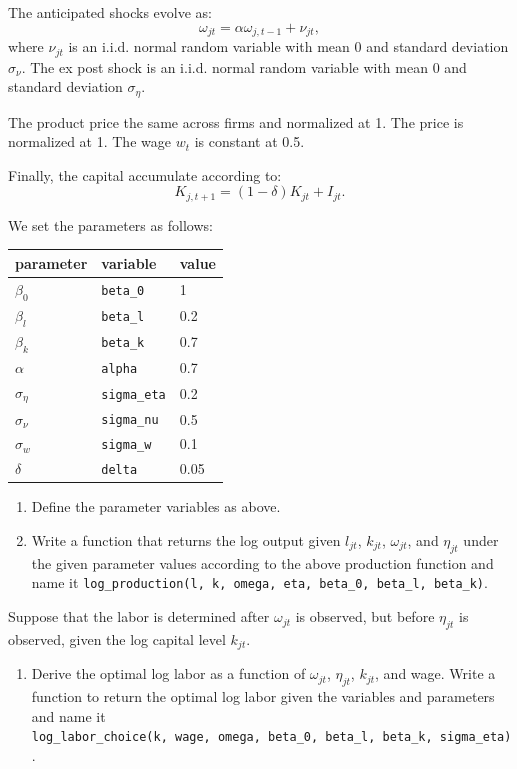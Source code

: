 \documentclass[
]{book}
\providecommand{\tightlist}{%
  \setlength{\itemsep}{0pt}\setlength{\parskip}{0pt}}
\begin{document}
The anticipated shocks evolve as:
\[
\omega_{jt} = \alpha \omega_{j, t - 1} + \nu_{jt},
\]
where \(\nu_{jt}\) is an i.i.d. normal random variable with mean 0 and standard deviation \(\sigma_\nu\). The ex post shock is an i.i.d. normal random variable with mean 0 and standard deviation \(\sigma_{\eta}\).

The product price the same across firms and normalized at 1. The price is normalized at 1. The wage \(w_t\) is constant at 0.5.

Finally, the capital accumulate according to:
\[
K_{j, t + 1} = (1 - \delta) K_{jt} + I_{jt}.
\]

We set the parameters as follows:

\begin{longtable}[]{@{}lll@{}}
\toprule()
parameter & variable & value \\
\midrule()
\endhead
\(\beta_0\) & \texttt{beta\_0} & 1 \\
\(\beta_l\) & \texttt{beta\_l} & 0.2 \\
\(\beta_k\) & \texttt{beta\_k} & 0.7 \\
\(\alpha\) & \texttt{alpha} & 0.7 \\
\(\sigma_{\eta}\) & \texttt{sigma\_eta} & 0.2 \\
\(\sigma_{\nu}\) & \texttt{sigma\_nu} & 0.5 \\
\(\sigma_{w}\) & \texttt{sigma\_w} & 0.1 \\
\(\delta\) & \texttt{delta} & 0.05 \\
\bottomrule()
\end{longtable}

\begin{enumerate}
\def\labelenumi{\arabic{enumi}.}
\item
  Define the parameter variables as above.
\item
  Write a function that returns the log output given \(l_{jt}\), \(k_{jt}\), \(\omega_{jt}\), and \(\eta_{jt}\) under the given parameter values according to the above production function and name it \texttt{log\_production(l,\ k,\ omega,\ eta,\ beta\_0,\ beta\_l,\ beta\_k)}.
\end{enumerate}

Suppose that the labor is determined after \(\omega_{jt}\) is observed, but before \(\eta_{jt}\) is observed, given the log capital level \(k_{jt}\).

\begin{enumerate}
\def\labelenumi{\arabic{enumi}.}
\setcounter{enumi}{2}
\tightlist
\item
  Derive the optimal log labor as a function of \(\omega_{jt}\), \(\eta_{jt}\), \(k_{jt}\), and wage. Write a function to return the optimal log labor given the variables and parameters and name it \texttt{log\_labor\_choice(k,\ wage,\ omega,\ beta\_0,\ beta\_l,\ beta\_k,\ sigma\_eta)}.
\end{enumerate}
\end{document}
